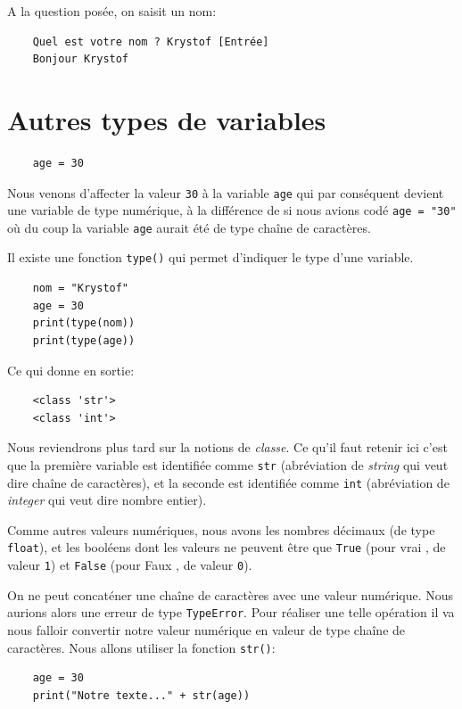 \documentclass[a4paper,12pt]{book}
\begin{document}
A la question posée, on saisit un nom:
\begin{verbatim}
    Quel est votre nom ? Krystof [Entrée]
    Bonjour Krystof
\end{verbatim}
\medskip

\section{Autres types de variables}
\begin{verbatim}
    age = 30
\end{verbatim}
\medskip

Nous venons d'affecter la valeur \texttt{30} à la variable \texttt{age} qui par conséquent devient une variable de type numérique, à la différence de si nous avions codé \verb|age = "30"| où du coup la variable \texttt{age} aurait été de type chaîne de caractères.
\medskip

Il existe une fonction \texttt{type()} qui permet d'indiquer le type d'une variable.
\begin{lstlisting}
    nom = "Krystof"
    age = 30
    print(type(nom))
    print(type(age))
\end{lstlisting}
\medskip

Ce qui donne en sortie:
\begin{verbatim}
    <class 'str'>
    <class 'int'>
\end{verbatim}
\medskip

Nous reviendrons plus tard sur la notions de \textit{classe}. Ce qu'il faut retenir ici c'est que la première variable est identifiée comme \texttt{str} (abréviation de \textit{string} qui veut dire \og chaîne de caractères\fg), et la seconde est identifiée comme \texttt{int} (abréviation de \textit{integer} qui veut dire \og nombre entier\fg).
\medskip

Comme autres valeurs numériques, nous avons les nombres décimaux (de type \texttt{float}), et les booléens dont les valeurs ne peuvent être que \texttt{True} (pour \og vrai \fg, de valeur \texttt{1}) et \texttt{False} (pour \og Faux \fg, de valeur \texttt{0}).
\medskip
  
On ne peut concaténer une chaîne de caractères avec une valeur numérique. Nous aurions alors une erreur de type \texttt{TypeError}. Pour réaliser une telle opération il va nous falloir convertir notre valeur numérique en valeur de type chaîne de caractères. Nous allons utiliser la fonction \texttt{str()}:
\begin{lstlisting}
    age = 30
    print("Notre texte..." + str(age))
\end{lstlisting}
\medskip
\end{document}
